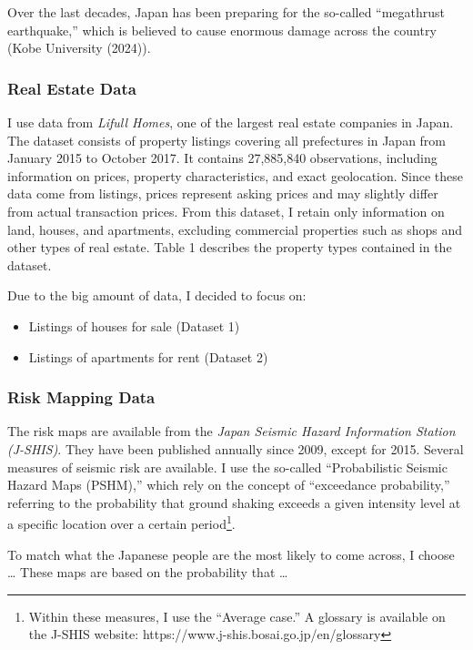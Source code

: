 \documentclass[
  letterpaper,
  DIV=11,
  numbers=noendperiod]{scrartcl}
\providecommand{\tightlist}{%
  \setlength{\itemsep}{0pt}\setlength{\parskip}{0pt}}
\begin{document}
Over the last decades, Japan has been preparing for the so-called
``megathrust earthquake,'' which is believed to cause enormous damage
across the country (Kobe University (2024)).

\subsubsection{Real Estate Data}

I use data from \textit{Lifull Homes}, one of the largest real estate
companies in Japan. The dataset consists of property listings covering
all prefectures in Japan from January 2015 to October 2017. It contains
27,885,840 observations, including information on prices, property
characteristics, and exact geolocation. Since these data come from
listings, prices represent asking prices and may slightly differ from
actual transaction prices. From this dataset, I retain only information
on land, houses, and apartments, excluding commercial properties such as
shops and other types of real estate. Table 1 describes the property
types contained in the dataset.

Due to the big amount of data, I decided to focus on:

\begin{itemize}
\tightlist
\item
  Listings of houses for sale (Dataset 1)
\item
  Listings of apartments for rent (Dataset 2)
\end{itemize}

\subsubsection{Risk Mapping Data}

The risk maps are available from the
\textit{Japan Seismic Hazard Information Station (J-SHIS)}. They have
been published annually since 2009, except for 2015. Several measures of
seismic risk are available. I use the so-called ``Probabilistic Seismic
Hazard Maps (PSHM),'' which rely on the concept of ``exceedance
probability,'' referring to the probability that ground shaking exceeds
a given intensity level at a specific location over a certain
period\footnote{Within these measures, I use the “Average case.” A glossary is available on the J-SHIS website: https://www.j-shis.bosai.go.jp/en/glossary}.

To match what the Japanese people are the most likely to come across, I
choose \ldots{} These maps are based on the probability that \ldots{}
\end{document}
